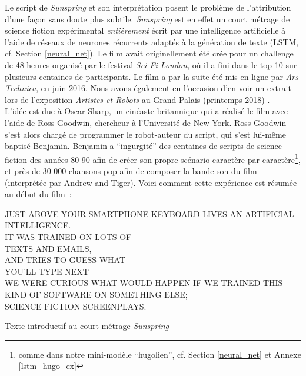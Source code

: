 \documentclass{article}
\newenvironment{citationbox}
{\begin{center}
		\begin{minipage}{.8\textwidth}
		}
		{
		\end{minipage}	
\end{center}
}
\begin{document}
					Le script de \textit{Sunspring} et son interprétation \cite{sunspring} posent le problème de l'attribution d'une façon sans doute plus subtile. \textit{Sunspring} est en effet un court métrage de science fiction expérimental \textit{entièrement} écrit par une intelligence artificielle à l'aide de réseaux de neurones récurrents adaptés à la génération de texte (LSTM, cf. Section \ref{neural_net}). Le film avait originellement été crée pour un challenge de 48 heures organisé par le festival \textit{Sci-Fi-London}, où il a fini dans le top 10 sur plusieurs centaines de participants. Le film a par la suite été mis en ligne par \textit{Ars Technica}, en juin 2016. Nous avons également eu l'occasion d'en voir un extrait lors de l'exposition \textit{Artistes et Robots} au Grand Palais (printemps 2018) \cite{artistes_robots}.\\
					
					L'idée est due à Oscar Sharp, un cinéaste britannique qui a réalisé le film avec l'aide de Ross Goodwin, chercheur à l'Université de New-York. Ross Goodwin s'est alors chargé de programmer le robot-auteur du script, qui s'est lui-même baptisé Benjamin. Benjamin a ``ingurgité'' des centaines de scripts de science fiction des années 80-90 afin de créer son propre scénario caractère par caractère\footnote{comme dans notre mini-modèle ``hugolien'', cf. Section \ref{neural_net} et Annexe \ref{lstm_hugo_ex}}, et près de 30 000 chansons pop afin de composer la bande-son du film (interprétée par Andrew and Tiger). Voici comment cette expérience est résumée au début du film~:
					
					\begin{citationbox}
						JUST ABOVE YOUR SMARTPHONE KEYBOARD LIVES AN ARTIFICIAL INTELLIGENCE.\\
						IT WAS TRAINED ON LOTS OF\\
						TEXTS AND EMAILS,\\
						AND TRIES TO GUESS WHAT\\
						YOU'LL TYPE NEXT\\
						
						WE WERE CURIOUS WHAT WOULD HAPPEN IF WE TRAINED THIS KIND OF SOFTWARE ON SOMETHING ELSE;\\
						
						SCIENCE FICTION SCREENPLAYS.
						\begin{flushright}
							Texte introductif au court-métrage  \textit{Sunspring}
						\end{flushright}
					\end{citationbox}
					
\end{document}
